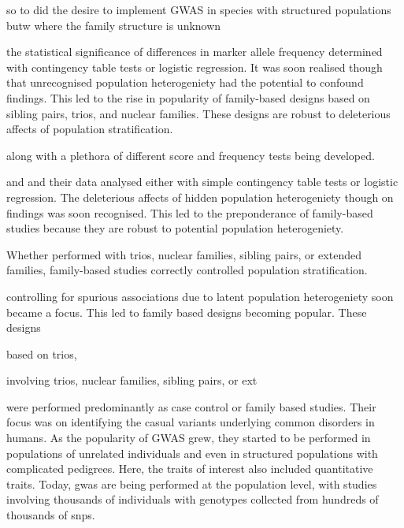 \documentclass[12pt]{article}
\begin{document}
so to did the desire to implement GWAS in species with structured populations butw where the family structure is unknown




 the statistical significance of differences in marker allele frequency determined with 
contingency table tests or logistic regression. It was soon realised though that unrecognised population heterogeniety 
had the potential to confound findings. This led to the rise in popularity of family-based designs based on 
sibling pairs, trios, and nuclear families.  These designs are robust to deleterious affects of population stratification. 



 along with a plethora of
different score and frequency tests being developed. 

and 
and their data analysed either 
with simple contingency table tests or logistic regression. The deleterious affects of hidden population heterogeniety though on findings was soon recognised. 
This led to the preponderance of family-based studies because they are robust to potential population heterogeniety. 

 Whether performed with trios, nuclear families, 
sibling pairs, or extended families, family-based studies correctly controlled population stratification. 


controlling for spurious associations 
due to latent population heterogeniety soon became a focus. This led to family based designs becoming popular. These designs 


 based on 
trios, 



involving trios, nuclear families, sibling pairs, or ext


were performed predominantly as case control or family based studies. Their focus 
was on identifying the casual variants underlying common disorders in humans. As the popularity of GWAS grew, 
they started to be performed in populations of unrelated individuals and even in structured populations with complicated pedigrees. 
Here, the traits of interest also included quantitative traits. Today, gwas are being performed at the population level, with studies 
involving thousands of individuals with genotypes collected from hundreds of thousands of snps. 
\end{document}

